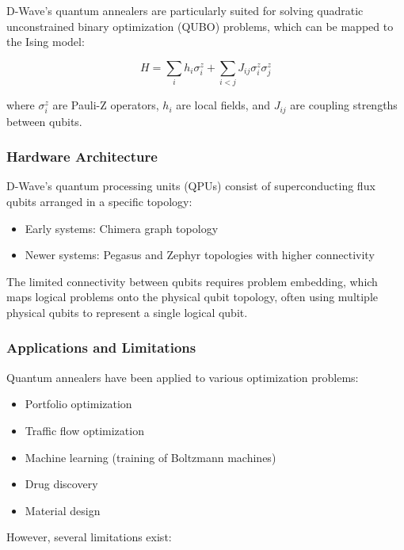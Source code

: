 D-Wave's quantum annealers are particularly suited for solving quadratic
unconstrained binary optimization (QUBO) problems, which can be mapped to the
Ising model:

\begin{equation}
  H = \sum_{i} h_i \sigma_i^z + \sum_{i<j} J_{ij} \sigma_i^z \sigma_j^z
\end{equation}

where $\sigma_i^z$ are Pauli-Z operators, $h_i$ are local fields, and
$J_{ij}$ are coupling strengths between qubits.

\subsubsection*{Hardware Architecture}

D-Wave's quantum processing units (QPUs) consist of superconducting flux
qubits arranged in a specific topology:

\begin{itemize}
  \item Early systems: Chimera graph topology
  \item Newer systems: Pegasus and Zephyr topologies with higher connectivity
\end{itemize}

The limited connectivity between qubits requires problem embedding, which
maps logical problems onto the physical qubit topology, often using multiple
physical qubits to represent a single logical qubit.

\subsubsection*{Applications and Limitations}

Quantum annealers have been applied to various optimization problems:
\begin{itemize}
  \item Portfolio optimization
  \item Traffic flow optimization
  \item Machine learning (training of Boltzmann machines)
  \item Drug discovery
  \item Material design
\end{itemize}

\vspace{0.3cm}

\noindent
However, several limitations exist:

